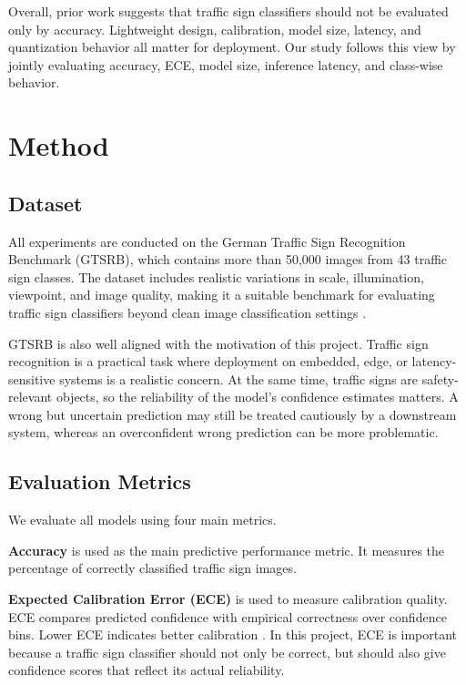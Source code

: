\documentclass{article} %
\begin{document}
Overall, prior work suggests that traffic sign classifiers should not be evaluated only by accuracy. Lightweight design, calibration, model size, latency, and quantization behavior all matter for deployment. Our study follows this view by jointly evaluating accuracy, ECE, model size, inference latency, and class-wise behavior.


\section{Method}

\subsection{Dataset}

All experiments are conducted on the German Traffic Sign Recognition Benchmark (GTSRB), which contains more than 50,000 images from 43 traffic sign classes. The dataset includes realistic variations in scale, illumination, viewpoint, and image quality, making it a suitable benchmark for evaluating traffic sign classifiers beyond clean image classification settings \citep{stallkamp2011gtsrb}.

GTSRB is also well aligned with the motivation of this project. Traffic sign recognition is a practical task where deployment on embedded, edge, or latency-sensitive systems is a realistic concern. At the same time, traffic signs are safety-relevant objects, so the reliability of the model's confidence estimates matters. A wrong but uncertain prediction may still be treated cautiously by a downstream system, whereas an overconfident wrong prediction can be more problematic.

\subsection{Evaluation Metrics}

We evaluate all models using four main metrics.

\textbf{Accuracy} is used as the main predictive performance metric. It measures the percentage of correctly classified traffic sign images.

\textbf{Expected Calibration Error (ECE)} is used to measure calibration quality. ECE compares predicted confidence with empirical correctness over confidence bins. Lower ECE indicates better calibration \citep{guo2017calibration}. In this project, ECE is important because a traffic sign classifier should not only be correct, but should also give confidence scores that reflect its actual reliability.
\end{document}

